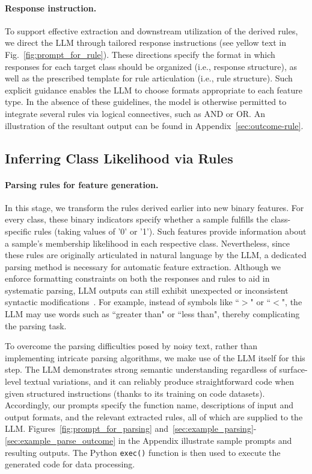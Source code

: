 \vspace*{-0.12in}
\paragraph{Response instruction.} To support effective extraction and downstream utilization of the derived rules, we direct the LLM through tailored response instructions (see yellow text in Fig.~\ref{fig:prompt_for_rule}). These directions specify the format in which responses for each target class should be organized (i.e., response structure), as well as the prescribed template for rule articulation (i.e., rule structure). Such explicit guidance enables the LLM to choose formats appropriate to each feature type. In the absence of these guidelines, the model is otherwise permitted to integrate several rules via logical connectives, such as AND or OR. An illustration of the resultant output can be found in Appendix~\ref{sec:outcome-rule}.

\subsection{Inferring Class Likelihood via Rules}
\label{Sec:training}

\paragraph{Parsing rules for feature generation.} In this stage, we transform the rules derived earlier into new binary features. For every class, these binary indicators specify whether a sample fulfills the class-specific rules (taking values of '0' or '1'). Such features provide information about a sample's membership likelihood in each respective class. Nevertheless, since these rules are originally articulated in natural language by the LLM, a dedicated parsing method is necessary for automatic feature extraction. Although we enforce formatting constraints on both the responses and rules to aid in systematic parsing, LLM outputs can still exhibit unexpected or inconsistent syntactic modifications~\cite{kovavc2023large}. For example, instead of symbols like ``$>$" or ``$<$", the LLM may use words such as ``greater than" or ``less than", thereby complicating the parsing task. 

To overcome the parsing difficulties posed by noisy text, rather than implementing intricate parsing algorithms, we make use of the LLM itself for this step. The LLM demonstrates strong semantic understanding regardless of surface-level textual variations, and it can reliably produce straightforward code when given structured instructions (thanks to its training on code datasets). Accordingly, our prompts specify the function name, descriptions of input and output formats, and the relevant extracted rules, all of which are supplied to the LLM. Figures~\ref{fig:prompt_for_parsing} and~\ref{sec:example_parsing}-\ref{sec:example_parse_outcome} in the Appendix illustrate sample prompts and resulting outputs. The Python \texttt{exec()} function is then used to execute the generated code for data processing.

